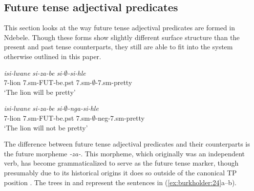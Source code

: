 \documentclass[output=paper]{langsci/langscibook}
\begin{document}
\subsection{Future tense adjectival predicates}

This section looks at the way future tense adjectival predicates are formed in Ndebele. Though these forms show slightly different surface structure than the present and past tense counterparts, they still are able to fit into the system otherwise outlined in this paper.


\begin{exe}
\ex\label{ex:burkholder:24} \begin{xlist}
\ex\label{ex:burkholder:24a} \gll \textit{isi-lwane} \textit{si-za-be} \textit{si-$\emptyset$-si-hle}\\
       7-lion 7.{\sc sm}-FUT-be.{\sc pst} 7.{\sc sm}-$\emptyset$-7.{\sc sm}-pretty\\
    \glt `The lion will be pretty' 

\ex\label{ex:burkholder:24b} \gll \textit{isi-lwane} \textit{si-za-be} \textit{si-$\emptyset$-nga-si-hle}\\
       7-lion 7.{\sc sm}-FUT-be.{\sc pst} 7.{\sc sm}-$\emptyset$-{\sc neg}-7.{\sc sm}-pretty\\
    \glt `The lion will not be pretty' 
\end{xlist}
\end{exe}

The difference between future tense adjectival predicates and their counterparts is the future morpheme \textit{-za-}. This morpheme, which originally was an independent verb, has become grammaticalized to serve as the future tense marker, though presumably due to its historical origins it does so outside of the canonical TP position \citep{Sibanda2004}. The trees in  and  represent the sentences in (\ref{ex:burkholder:24}a--b).
\end{document}
